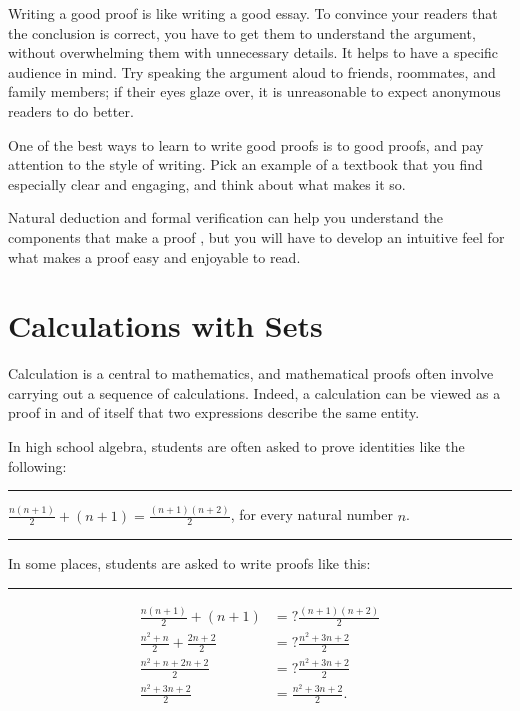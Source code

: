 \documentclass[letterpaper,10pt,english]{sphinxmanual}
\begin{document}
\sphinxAtStartPar
Writing a good proof is like writing a good essay. To convince your readers that the conclusion is correct, you have to get them to understand the argument, without overwhelming them with unnecessary details. It helps to have a specific audience in mind. Try speaking the argument aloud to friends, roommates, and family members; if their eyes glaze over, it is unreasonable to expect anonymous readers to do better.

\sphinxAtStartPar
One of the best ways to learn to write good proofs is to  good proofs, and pay attention to the style of writing. Pick an example of a textbook that you find especially clear and engaging, and think about what makes it so.

\sphinxAtStartPar
Natural deduction and formal verification can help you understand the components that make a proof , but you will have to develop an intuitive feel for what makes a proof easy and enjoyable to read.


\section{Calculations with Sets}
\label{\detokenize{sets:calculations-with-sets}}
\sphinxAtStartPar
Calculation is a central to mathematics, and mathematical proofs often involve carrying out a sequence of calculations. Indeed, a calculation can be viewed as a proof in and of itself that two expressions describe the same entity.

\sphinxAtStartPar
In high school algebra, students are often asked to prove identities like the following:


\bigskip\hrule\bigskip


\sphinxAtStartPar
{} \(\frac{n(n+1)}{2} + (n + 1) = \frac{(n+1)(n+2)}{2}\), for every natural number \(n\).


\bigskip\hrule\bigskip


\sphinxAtStartPar
In some places, students are asked to write proofs like this:


\bigskip\hrule\bigskip


\sphinxAtStartPar
{}
\begin{equation*}
\begin{split}\frac{n(n+1)}{2} + (n + 1) & =? \frac{(n+1)(n+2)}{2} \\
\frac{n^2+n}{2} + \frac{2n + 2}{2} & =? \frac{n^2 + 3n + 2}{2} \\
\frac{n^2+n + 2n + 2}{2} & =? \frac{n^2 + 3n + 2}{2} \\
\frac{n^2+3n + 2}{2} & = \frac{n^2 + 3n + 2}{2}. \\\end{split}
\end{equation*}
\end{document}
